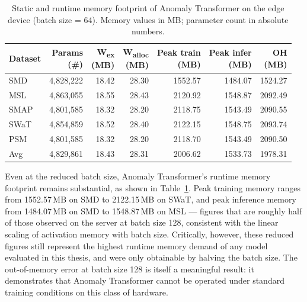 \documentclass[twoside,11pt,openright]{report}
\begin{document}
\begin{table}[ht]
\centering
\caption{Static and runtime memory footprint of Anomaly Transformer on the edge device
(batch size = 64). Memory values in MB; parameter count in absolute numbers.}
\label{tab:memory_runtime_edge_anomtr}
\begin{tabular}{l rrrrrr}
\toprule
\textbf{Dataset}
    & \thead{\textbf{Params}\\(\#)}
    & \thead{\textbf{W\textsubscript{ex}}\\(MB)}
    & \thead{\textbf{W\textsubscript{alloc}}\\(MB)}
    & \thead{\textbf{Peak train}\\(MB)}
    & \thead{\textbf{Peak infer}\\(MB)}
    & \thead{\textbf{OH}\\(MB)} \\
\midrule
SMD  & 4{,}828{,}222 & 18.42 & 28.30 & 1552.57 & 1484.07 & 1524.27 \\
MSL  & 4{,}863{,}055 & 18.55 & 28.43 & 2120.92 & 1548.87 & 2092.49 \\
SMAP & 4{,}801{,}585 & 18.32 & 28.20 & 2118.75 & 1543.49 & 2090.55 \\
SWaT & 4{,}854{,}859 & 18.52 & 28.40 & 2122.15 & 1548.75 & 2093.74 \\
PSM  & 4{,}801{,}585 & 18.32 & 28.20 & 2118.70 & 1543.49 & 2090.50 \\
\midrule
Avg  & 4{,}829{,}861 & 18.43 & 28.31 & 2006.62 & 1533.73 & 1978.31 \\
\bottomrule
\end{tabular}
\end{table}

Even at the reduced batch size, Anomaly Transformer's runtime memory footprint
remains substantial, as shown in Table~\ref{tab:memory_runtime_edge_anomtr}. 
Peak training memory ranges from 1552.57\,MB on SMD to
2122.15\,MB on SWaT, and peak inference memory from 1484.07\,MB on SMD to
1548.87\,MB on MSL --- figures that are roughly half of those observed on the
server at batch size 128, consistent with the linear scaling of activation memory
with batch size. Critically, however, these reduced figures still represent 
the highest runtime memory demand of any
model evaluated in this thesis, and were only obtainable by halving the batch size. 
The out-of-memory error at
batch size 128 is itself a meaningful result: it demonstrates that Anomaly
Transformer cannot be operated under standard training conditions on this class of
hardware.
\end{document}
